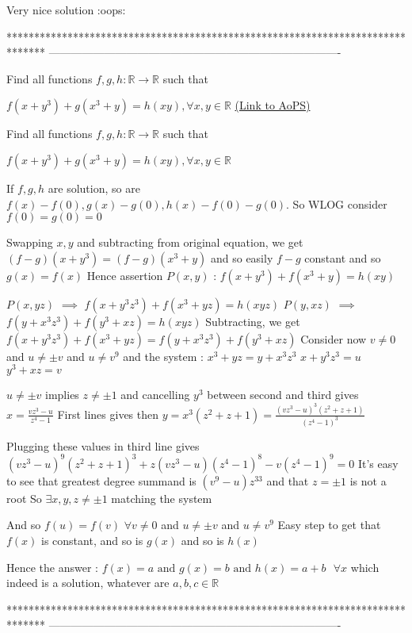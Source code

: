 \begin{solution}
	Very nice solution  :oops: 
\end{solution}
*******************************************************************************
-------------------------------------------------------------------------------

\begin{problem}
	Find all functions $ f,g,h: \mathbb{R}\rightarrow \mathbb{R} $  such that

$f\left ( x+y^{3} \right )+g\left ( x^{3} +y\right )=h(xy),\forall x,y\in \mathbb{R}$
	\flushright \href{https://artofproblemsolving.com/community/c6h618338}{(Link to AoPS)}
\end{problem}



\begin{solution}
	\begin{tcolorbox}Find all functions $ f,g,h: \mathbb{R}\rightarrow \mathbb{R} $  such that

$f\left ( x+y^{3} \right )+g\left ( x^{3} +y\right )=h(xy),\forall x,y\in \mathbb{R}$\end{tcolorbox}
If $f,g,h$ are solution, so are $f(x)-f(0),g(x)-g(0), h(x)-f(0)-g(0)$. So WLOG consider $f(0)=g(0)=0$

Swapping $x,y$ and subtracting from original equation, we get $(f-g)(x+y^3)=(f-g)(x^3+y)$ and so easily $f-g$ constant and so $g(x)=f(x)$ 
Hence assertion $P(x,y)$ : $f(x+y^3)+f(x^3+y)=h(xy)$ 

$P(x,yz)$ $\implies$ $f(x+y^3z^3)+f(x^3+yz)=h(xyz)$ 
$P(y,xz)$ $\implies$ $f(y+x^3z^3)+f(y^3+xz)=h(xyz)$ 
Subtracting, we get $f(x+y^3z^3)+f(x^3+yz)=f(y+x^3z^3)+f(y^3+xz)$
Consider now $v\ne 0$ and $u\ne \pm v$ and $u\ne v^9$ and the system :
$x^3+yz=y+x^3z^3$
$x+y^3z^3=u$
$y^3+xz=v$

$u\ne \pm v$ implies $z\ne \pm 1$ and cancelling $y^3$ between second and third gives $x=\frac{vz^3-u}{z^4-1}$
First lines gives then $y=x^3(z^2+z+1)=\frac{(vz^3-u)^3(z^2+z+1)}{(z^4-1)^3}$

Plugging these values in third line gives $(vz^3-u)^9(z^2+z+1)^3+z(vz^3-u)(z^4-1)^8-v(z^4-1)^9=0$
It's easy to see that greatest degree summand is $(v^9-u)z^{33}$ and that $z=\pm 1$ is not a root
So $\exists x,y,z\ne \pm 1$ matching the system

And so $f(u)=f(v)$ $\forall v\ne 0$ and $u\ne \pm v$ and $u\ne v^9$
Easy step to get that $f(x)$ is constant, and so is $g(x)$ and so is $h(x)$

Hence the answer : $\boxed{f(x)=a\text{ and }g(x)=b\text{ and }h(x)=a+b\text{  }\forall x}$ which indeed is a solution, whatever are $a,b,c\in\mathbb R$
\end{solution}
*******************************************************************************
-------------------------------------------------------------------------------

